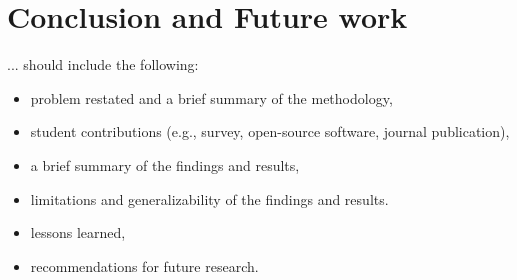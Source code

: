 \chapter{Conclusion and Future work}
\label{cha:chapter8}
... should include the following:
\begin{itemize}

  \item problem restated and a brief summary of the methodology,
  \item student contributions (e.g., survey, open-source software, journal publication),
  \item a brief summary of the findings and results,
  \item limitations and generalizability of the findings and results.
  \item lessons learned,
  \item recommendations for future research.

\end{itemize}


